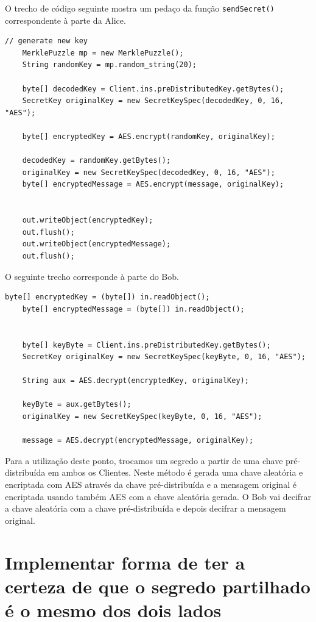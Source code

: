 O trecho de código seguinte mostra um pedaço da função \texttt{sendSecret()} correspondente à parte da Alice. 
\begin{lstlisting}[caption=Trecho de código usado no projeto.]
    // generate new key
    MerklePuzzle mp = new MerklePuzzle();
    String randomKey = mp.random_string(20);
    
    byte[] decodedKey = Client.ins.preDistributedKey.getBytes();
    SecretKey originalKey = new SecretKeySpec(decodedKey, 0, 16, "AES");

    byte[] encryptedKey = AES.encrypt(randomKey, originalKey);

    decodedKey = randomKey.getBytes();
    originalKey = new SecretKeySpec(decodedKey, 0, 16, "AES");
    byte[] encryptedMessage = AES.encrypt(message, originalKey);
    

    out.writeObject(encryptedKey);
    out.flush();
    out.writeObject(encryptedMessage);
    out.flush();
\end{lstlisting}
O seguinte trecho corresponde à parte do Bob.
\begin{lstlisting}[caption=Trecho de código usado no projeto.]
    byte[] encryptedKey = (byte[]) in.readObject();
    byte[] encryptedMessage = (byte[]) in.readObject();
    
    
    byte[] keyByte = Client.ins.preDistributedKey.getBytes();
    SecretKey originalKey = new SecretKeySpec(keyByte, 0, 16, "AES");

    String aux = AES.decrypt(encryptedKey, originalKey);

    keyByte = aux.getBytes();
    originalKey = new SecretKeySpec(keyByte, 0, 16, "AES");

    message = AES.decrypt(encryptedMessage, originalKey);
\end{lstlisting}

Para a utilização deste ponto, trocamos um segredo a partir de uma chave pré-distribuída em ambos os Clientes. Neste método é gerada uma chave aleatória e encriptada com AES através da chave pré-distribuída e a mensagem original é encriptada usando também AES com a chave aleatória gerada. O Bob vai decifrar a chave aleatória com a chave pré-distribuída e depois decifrar a mensagem original.

\section{Implementar forma de ter a certeza de que o segredo partilhado é o mesmo dos dois lados}
\label{chap4:sec:assinaturadigital}

